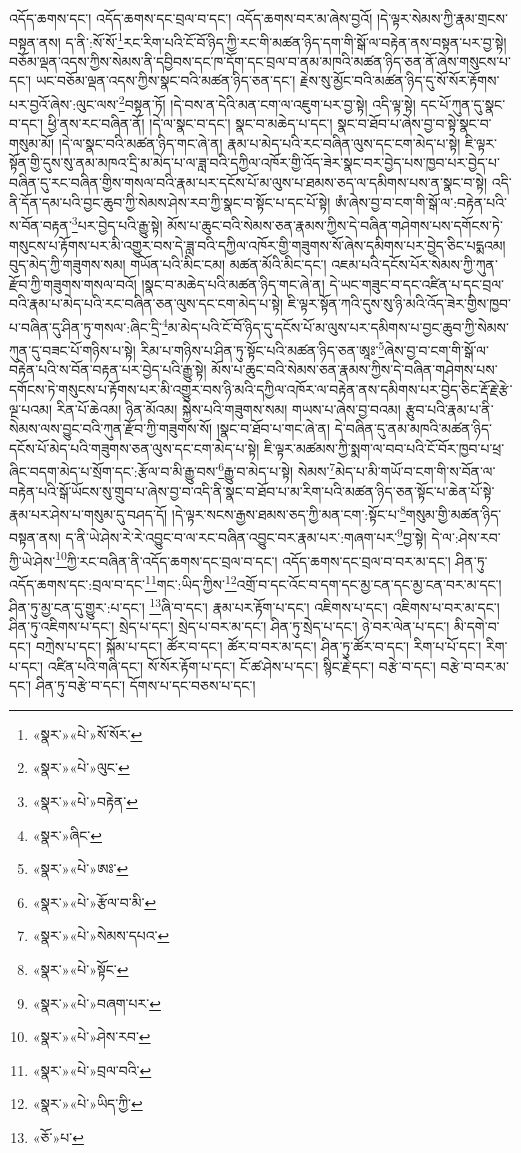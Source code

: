 འདོད་ཆགས་དང་། འདོད་ཆགས་དང་བྲལ་བ་དང་། འདོད་ཆགས་བར་མ་ཞེས་བྱའོ། །དེ་ལྟར་སེམས་ཀྱི་རྣམ་གྲངས་བསྟན་ནས། ད་ནི་:སོ་སོ་\footnote{«སྣར་»«པེ་»སོ་སོར་}རང་རིག་པའི་ངོ་བོ་ཉིད་ཀྱི་རང་གི་མཚན་ཉིད་དག་གི་སྒོ་ལ་བརྟེན་ནས་བསྟན་པར་བྱ་སྟེ། བཅོམ་ལྡན་འདས་ཀྱིས་སེམས་ནི་དབྱིབས་དང་ཁ་དོག་དང་བྲལ་བ་ནམ་མཁའི་མཚན་ཉིད་ཅན་ནོ་ཞེས་གསུངས་པ་དང་། ཡང་བཅོམ་ལྡན་འདས་ཀྱིས་སྣང་བའི་མཚན་ཉིད་ཅན་དང་། རྗེས་སུ་མྱོང་བའི་མཚན་ཉིད་དུ་སོ་སོར་རྟོགས་པར་བྱའོ་ཞེས་:ལུང་ལས་\footnote{«སྣར་»«པེ་»ལུང་}བསྟན་ཏོ། །དེ་བས་ན་དེའི་མན་ངག་ལ་འཇུག་པར་བྱ་སྟེ། འདི་ལྟ་སྟེ། དང་པོ་ཀུན་དུ་སྣང་བ་དང་། ཕྱི་ནས་རང་བཞིན་ནོ། །དེ་ལ་སྣང་བ་དང་། སྣང་བ་མཆེད་པ་དང་། སྣང་བ་ཐོབ་པ་ཞེས་བྱ་བ་སྟེ་སྣང་བ་གསུམ་མོ། །དེ་ལ་སྣང་བའི་མཚན་ཉིད་གང་ཞེ་ན། རྣམ་པ་མེད་པའི་རང་བཞིན་ལུས་དང་ངག་མེད་པ་སྟེ། ཇི་ལྟར་སྟོན་གྱི་དུས་སུ་ནམ་མཁའ་དྲི་མ་མེད་པ་ལ་ཟླ་བའི་དཀྱིལ་འཁོར་གྱི་འོད་ཟེར་སྣང་བར་བྱེད་པས་ཁྱབ་པར་བྱེད་པ་བཞིན་དུ་རང་བཞིན་གྱིས་གསལ་བའི་རྣམ་པར་དངོས་པོ་མ་ལུས་པ་ཐམས་ཅད་ལ་དམིགས་པས་ན་སྣང་བ་སྟེ། འདི་ནི་དོན་དམ་པའི་བྱང་ཆུབ་ཀྱི་སེམས་ཤེས་རབ་ཀྱི་སྣང་བ་སྟོང་པ་དང་པོ་སྟེ། ཨཾ་ཞེས་བྱ་བ་ངག་གི་སྒོ་ལ་:བརྟེན་པའི་ས་བོན་བརྟན་\footnote{«སྣར་»«པེ་»བརྟེན་}པར་བྱེད་པའི་རྒྱུ་སྟེ། མོས་པ་ཆུང་བའི་སེམས་ཅན་རྣམས་ཀྱིས་དེ་བཞིན་གཤེགས་པས་དགོངས་ཏེ་གསུངས་པ་རྟོགས་པར་མི་འགྱུར་བས་དེ་ཟླ་བའི་དཀྱིལ་འཁོར་གྱི་གཟུགས་སོ་ཞེས་དམིགས་པར་བྱེད་ཅིང་པདྨའམ། བུད་མེད་ཀྱི་གཟུགས་སམ། གཡོན་པའི་མིང་ངམ། མཚན་མོའི་མིང་དང་། འཇམ་པའི་དངོས་པོར་སེམས་ཀྱི་ཀུན་རྫོབ་ཀྱི་གཟུགས་གསལ་བའོ། །སྣང་བ་མཆེད་པའི་མཚན་ཉིད་གང་ཞེ་ན། དེ་ཡང་གཟུང་བ་དང་འཛིན་པ་དང་བྲལ་བའི་རྣམ་པ་མེད་པའི་རང་བཞིན་ཅན་ལུས་དང་ངག་མེད་པ་སྟེ། ཇི་ལྟར་སྟོན་ཀའི་དུས་སུ་ཉི་མའི་འོད་ཟེར་གྱིས་ཁྱབ་པ་བཞིན་དུ་ཤིན་ཏུ་གསལ་:ཞིང་དྲི་\footnote{«སྣར་»ཞིང་}མ་མེད་པའི་ངོ་བོ་ཉིད་དུ་དངོས་པོ་མ་ལུས་པར་དམིགས་པ་བྱང་ཆུབ་ཀྱི་སེམས་ཀུན་དུ་བཟང་པོ་གཉིས་པ་སྟེ། རིམ་པ་གཉིས་པ་ཤིན་ཏུ་སྟོང་པའི་མཚན་ཉིད་ཅན་ཨཱཿ་\footnote{«སྣར་»«པེ་»ཨཿ་}ཞེས་བྱ་བ་ངག་གི་སྒོ་ལ་བརྟེན་པའི་ས་བོན་བརྟན་པར་བྱེད་པའི་རྒྱུ་སྟེ། མོས་པ་ཆུང་བའི་སེམས་ཅན་རྣམས་ཀྱིས་དེ་བཞིན་གཤེགས་པས་དགོངས་ཏེ་གསུངས་པ་རྟོགས་པར་མི་འགྱུར་བས་ཉི་མའི་དཀྱིལ་འཁོར་ལ་བརྟེན་ནས་དམིགས་པར་བྱེད་ཅིང་རྡོ་རྗེ་རྩེ་ལྔ་པའམ། རིན་པོ་ཆེའམ། ཉིན་མོའམ། སྐྱེས་པའི་གཟུགས་སམ། གཡས་པ་ཞེས་བྱ་བའམ། རྩུབ་པའི་རྣམ་པ་ནི་སེམས་ལས་བྱུང་བའི་ཀུན་རྫོབ་ཀྱི་གཟུགས་སོ། །སྣང་བ་ཐོབ་པ་གང་ཞེ་ན། དེ་བཞིན་དུ་ནམ་མཁའི་མཚན་ཉིད་དངོས་པོ་མེད་པའི་གཟུགས་ཅན་ལུས་དང་ངག་མེད་པ་སྟེ། ཇི་ལྟར་མཚམས་ཀྱི་སྨག་ལ་བབ་པའི་ངོ་བོར་ཁྱབ་པ་ཕྲ་ཞིང་བདག་མེད་པ་སྲོག་དང་:རྩོལ་བ་མི་རྒྱུ་བས་\footnote{«སྣར་»«པེ་»རྩོལ་བ་མི་}རྒྱུ་བ་མེད་པ་སྟེ། སེམས་\footnote{«སྣར་»«པེ་»སེམས་དཔའ་}མེད་པ་མི་གཡོ་བ་ངག་གི་ས་བོན་ལ་བརྟེན་པའི་སྒོ་ཡོངས་སུ་གྲུབ་པ་ཞེས་བྱ་བ་འདི་ནི་སྣང་བ་ཐོབ་པ་མ་རིག་པའི་མཚན་ཉིད་ཅན་སྟོང་པ་ཆེན་པོ་སྟེ་རྣམ་པར་ཤེས་པ་གསུམ་དུ་བཤད་དོ། །དེ་ལྟར་སངས་རྒྱས་ཐམས་ཅད་ཀྱི་མན་ངག་:སྟོང་པ་\footnote{«སྣར་»«པེ་»སྟོང་}གསུམ་གྱི་མཚན་ཉིད་བསྟན་ནས། ད་ནི་ཡེ་ཤེས་རེ་རེ་འབྱུང་བ་ལ་རང་བཞིན་འབྱུང་བར་རྣམ་པར་:གཞག་པར་\footnote{«སྣར་»«པེ་»བཞག་པར་}བྱ་སྟེ། དེ་ལ་:ཤེས་རབ་ཀྱི་ཡེ་ཤེས་\footnote{«སྣར་»«པེ་»ཤེས་རབ་}ཀྱི་རང་བཞིན་ནི་འདོད་ཆགས་དང་བྲལ་བ་དང་། འདོད་ཆགས་དང་བྲལ་བ་བར་མ་དང་། ཤིན་ཏུ་འདོད་ཆགས་དང་:བྲལ་བ་དང་\footnote{«སྣར་»«པེ་»བྲལ་བའི་}གང་:ཡིད་ཀྱིས་\footnote{«སྣར་»«པེ་»ཡིད་ཀྱི་}འགྲོ་བ་དང་འོང་བ་དག་དང་མྱ་ངན་དང་མྱ་ངན་བར་མ་དང་། ཤིན་ཏུ་མྱ་ངན་དུ་གྱུར་:པ་དང་། \footnote{«ཅོ་»པ་}ཞི་བ་དང་། རྣམ་པར་རྟོག་པ་དང་། འཇིགས་པ་དང་། འཇིགས་པ་བར་མ་དང་། ཤིན་ཏུ་འཇིགས་པ་དང་། སྲེད་པ་དང་། སྲེད་པ་བར་མ་དང་། ཤིན་ཏུ་སྲེད་པ་དང་། ཉེ་བར་ལེན་པ་དང་། མི་དགེ་བ་དང་། བཀྲེས་པ་དང་། སྐོམ་པ་དང་། ཚོར་བ་དང་། ཚོར་བ་བར་མ་དང་། ཤིན་ཏུ་ཚོར་བ་དང་། རིག་པ་པོ་དང་། རིག་པ་དང་། འཛིན་པའི་གཞི་དང་། སོ་སོར་རྟོག་པ་དང་། ངོ་ཚ་ཤེས་པ་དང་། སྙིང་རྗེ་དང་། བརྩེ་བ་དང་། བརྩེ་བ་བར་མ་དང་། ཤིན་ཏུ་བརྩེ་བ་དང་། དོགས་པ་དང་བཅས་པ་དང་། 